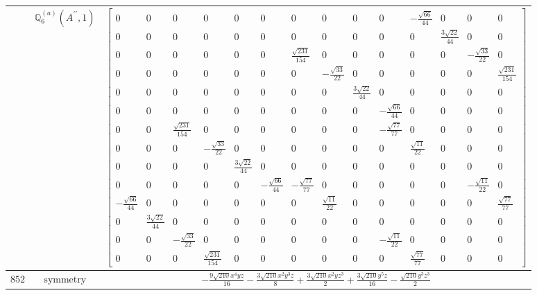\documentclass[fleqn,8pt,landscape]{jsarticle}
\begin{document}
\begin{longtable}{ccc}
$  $ & $ \mathbb{Q}_{6}^{(a)}(A^{\prime\prime},1) $ & $ \begin{bmatrix} 0 & 0 & 0 & 0 & 0 & 0 & 0 & 0 & 0 & 0 & - \frac{\sqrt{66}}{44} & 0 & 0 & 0 \\ 0 & 0 & 0 & 0 & 0 & 0 & 0 & 0 & 0 & 0 & 0 & \frac{3 \sqrt{22}}{44} & 0 & 0 \\ 0 & 0 & 0 & 0 & 0 & 0 & \frac{\sqrt{231}}{154} & 0 & 0 & 0 & 0 & 0 & - \frac{\sqrt{33}}{22} & 0 \\ 0 & 0 & 0 & 0 & 0 & 0 & 0 & - \frac{\sqrt{33}}{22} & 0 & 0 & 0 & 0 & 0 & \frac{\sqrt{231}}{154} \\ 0 & 0 & 0 & 0 & 0 & 0 & 0 & 0 & \frac{3 \sqrt{22}}{44} & 0 & 0 & 0 & 0 & 0 \\ 0 & 0 & 0 & 0 & 0 & 0 & 0 & 0 & 0 & - \frac{\sqrt{66}}{44} & 0 & 0 & 0 & 0 \\ 0 & 0 & \frac{\sqrt{231}}{154} & 0 & 0 & 0 & 0 & 0 & 0 & - \frac{\sqrt{77}}{77} & 0 & 0 & 0 & 0 \\ 0 & 0 & 0 & - \frac{\sqrt{33}}{22} & 0 & 0 & 0 & 0 & 0 & 0 & \frac{\sqrt{11}}{22} & 0 & 0 & 0 \\ 0 & 0 & 0 & 0 & \frac{3 \sqrt{22}}{44} & 0 & 0 & 0 & 0 & 0 & 0 & 0 & 0 & 0 \\ 0 & 0 & 0 & 0 & 0 & - \frac{\sqrt{66}}{44} & - \frac{\sqrt{77}}{77} & 0 & 0 & 0 & 0 & 0 & - \frac{\sqrt{11}}{22} & 0 \\ - \frac{\sqrt{66}}{44} & 0 & 0 & 0 & 0 & 0 & 0 & \frac{\sqrt{11}}{22} & 0 & 0 & 0 & 0 & 0 & \frac{\sqrt{77}}{77} \\ 0 & \frac{3 \sqrt{22}}{44} & 0 & 0 & 0 & 0 & 0 & 0 & 0 & 0 & 0 & 0 & 0 & 0 \\ 0 & 0 & - \frac{\sqrt{33}}{22} & 0 & 0 & 0 & 0 & 0 & 0 & - \frac{\sqrt{11}}{22} & 0 & 0 & 0 & 0 \\ 0 & 0 & 0 & \frac{\sqrt{231}}{154} & 0 & 0 & 0 & 0 & 0 & 0 & \frac{\sqrt{77}}{77} & 0 & 0 & 0 \end{bmatrix} $ \\ \hline
$ 852 $ & $ \text{symmetry} $ & $ - \frac{9 \sqrt{210} x^{4} y z}{16} - \frac{3 \sqrt{210} x^{2} y^{3} z}{8} + \frac{3 \sqrt{210} x^{2} y z^{3}}{2} + \frac{3 \sqrt{210} y^{5} z}{16} - \frac{\sqrt{210} y^{3} z^{3}}{2} $ \\

\end{longtable}
\end{document}
